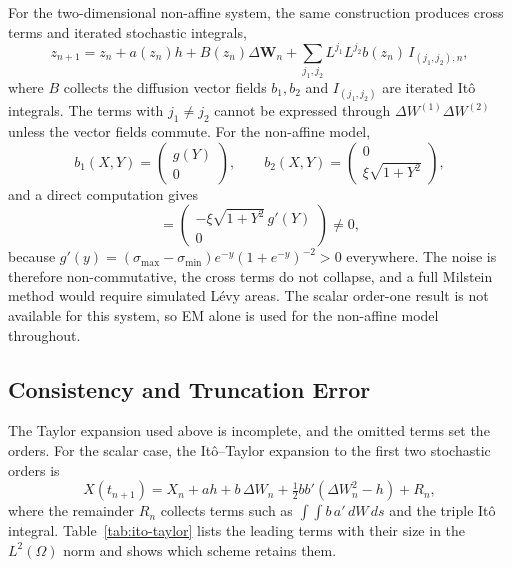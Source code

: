 \documentclass[11pt,a4paper]{article}
\theoremstyle{definition}
\theoremstyle{remark}
\begin{document}
For the two-dimensional non-affine system, the same construction produces cross
terms and iterated stochastic integrals,
\begin{equation}
    z_{n+1} = z_n + a(z_n) h + B(z_n) \Delta \bm{W}_n
              + \sum_{j_1, j_2} L^{j_1} L^{j_2} b(z_n)\,
                I_{(j_1, j_2), n},
    \label{eq:milstein-multi}
\end{equation}
where $B$ collects the diffusion vector fields $b_1, b_2$ and
$I_{(j_1,j_2)}$ are iterated It\^o integrals. The terms with
$j_1 \ne j_2$ cannot be expressed through
$\Delta W^{(1)} \Delta W^{(2)}$ unless the vector fields commute. For the
non-affine model,
\begin{equation}
    b_1(X, Y) = \begin{pmatrix} g(Y) \\ 0 \end{pmatrix},
    \qquad
    b_2(X, Y) = \begin{pmatrix} 0 \\ \xi \sqrt{1 + Y^2} \end{pmatrix},
    \label{eq:vector-fields}
\end{equation}
and a direct computation gives
\begin{equation}
    [b_1, b_2] =
    \begin{pmatrix} -\xi \sqrt{1 + Y^2}\, g'(Y) \\ 0 \end{pmatrix} \ne 0,
    \label{eq:lie-bracket}
\end{equation}
because $g'(y) = (\sigma_{\max} - \sigma_{\min}) e^{-y} (1 + e^{-y})^{-2} > 0$
everywhere. The noise is therefore non-commutative, the cross terms do not
collapse, and a full Milstein method would require simulated L\'evy areas. The
scalar order-one result is not available for this system, so EM alone is used
for the non-affine model throughout.

\subsection{Consistency and Truncation Error}
\label{sec:truncation}

The Taylor expansion used above is incomplete, and the omitted terms set the
orders. For the scalar case, the It\^o--Taylor expansion to the first two
stochastic orders is
\begin{equation}
    X(t_{n+1}) = X_n + a h + b\, \Delta W_n
                 + \tfrac12 b b' \left( \Delta W_n^2 - h \right)
                 + R_n ,
    \label{eq:ito-taylor}
\end{equation}
where the remainder $R_n$ collects terms such as
$\int\!\int b\, a'\, dW\, ds$ and the triple It\^o integral.
Table~\ref{tab:ito-taylor} lists the leading terms with their size in the
$L^2(\Omega)$ norm and shows which scheme retains them.
\end{document}
